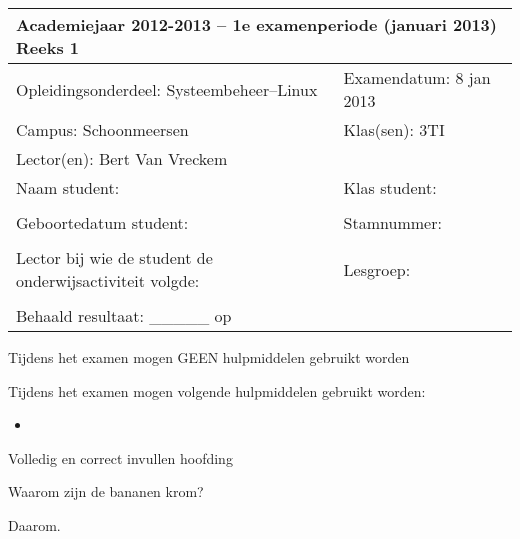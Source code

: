 \documentclass{exam}
\newif\ifsolution %
\newcommand{\academiejaar}{2012-2013}   %
\newcommand{\examenperiode}{1e}         %
\newcommand{\examenmaand}{januari 2013} %
\newcommand{\reeks}{Reeks 1}            %
\newcommand{\olod}{Systeembeheer--Linux} %
\newcommand{\examendatum}{8 jan 2013}
\newcommand{\campus}{Schoonmeersen}      %
\newcommand{\klassen}{3TI}               %
\newcommand{\lectoren}{Bert Van Vreckem}
\begin{document}
\ifsolution
\begin{center}
\LARGE{\textbf{VOORBEELDOPLOSSING}}
\end{center}
\fi

\begin{tabular}{|l|l|l|}
\hline
\multicolumn{3}{|p{.95\textwidth}|}{\textbf{Academiejaar \academiejaar{} -- \examenperiode{} examenperiode (\examenmaand) \hfill \reeks}}\tabularnewline
\hline
\multicolumn{2}{|p{.65\textwidth}|}{Opleidingsonderdeel: \olod} & Examendatum: \examendatum \tabularnewline
\multicolumn{2}{|p{.65\textwidth}|}{Campus: \campus{}} & Klas(sen): \klassen \tabularnewline
\multicolumn{2}{|p{.65\textwidth}|}{Lector(en): \lectoren} &  \tabularnewline
\hline
Naam student: & \multicolumn{2}{|p{.4\textwidth}|}{Klas student: }\tabularnewline
 & \multicolumn{2}{|p{.4\textwidth}|}{}\tabularnewline
\hline
Geboortedatum student: & \multicolumn{2}{|p{.4\textwidth}|}{Stamnummer: }\tabularnewline
 & \multicolumn{2}{|p{.4\textwidth}|}{}\tabularnewline
\hline
Lector bij wie de student de onderwijsactiviteit volgde: \enspace \hrulefill & \multicolumn{2}{|p{.4\textwidth}|}{Lesgroep: }\tabularnewline
 & \multicolumn{2}{|p{.4\textwidth}|}{}\tabularnewline
\hline
\multicolumn{3}{|l|}{Behaald resultaat: \_\_\_\_\_ op \numpoints{}}\tabularnewline
\hline
\end{tabular}

\vspace{.3cm}

\XBox Tijdens het examen mogen GEEN hulpmiddelen gebruikt worden

\Square Tijdens het examen mogen volgende hulpmiddelen gebruikt worden:
\begin{itemize}
\item
\end{itemize}

\hrulefill

\begin{questions}

\framedsolutions
\ifsolution
  \printanswers
\else
  \noprintanswers
\fi

  
\question[1] Volledig en correct invullen hoofding

\question[9] Waarom zijn de bananen krom?
  
\begin{solutionordottedlines}[3cm]
Daarom.
\end{solutionordottedlines}

\end{questions}
\end{document}

